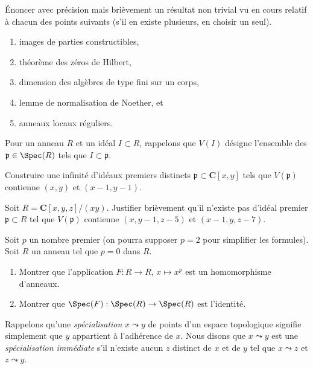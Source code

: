 \begin{exercise}[Théorèmes]
\label{exercise-results-fall-2019}
Énoncer avec précision mais brièvement un résultat non trivial vu en cours
relatif à chacun des points suivants (s'il en existe plusieurs, en choisir
un seul).
\begin{enumerate}
\item images de parties constructibles,
\item théorème des zéros de Hilbert,
\item dimension des algèbres de type fini sur un corps,
\item lemme de normalisation de Noether, et
\item anneaux locaux réguliers.
\end{enumerate}
\end{exercise}

\noindent
Pour un anneau $R$ et un idéal $I \subset R$, rappelons que $V(I)$
désigne l'ensemble des $\mathfrak p \in \Spec(R)$ tels que $I \subset \mathfrak p$.

\begin{exercise}
\label{exercise-infinitely-many-primes}
Construire une infinité d'idéaux premiers distincts
$\mathfrak p \subset \mathbf{C}[x, y]$
tels que $V(\mathfrak p)$ contienne $(x, y)$ et $(x - 1, y - 1)$.
\end{exercise}

\begin{exercise}
\label{exercise-no-prime}
Soit $R = \mathbf{C}[x, y, z]/(xy)$. Justifier brièvement qu'il n'existe pas
d'idéal premier $\mathfrak p \subset R$ tel que
$V(\mathfrak p)$ contienne $(x, y - 1, z - 5)$ et $(x - 1, y, z - 7)$.
\end{exercise}

\begin{exercise}[Frobenius]
\label{exercise-frobenius}
Soit $p$ un nombre premier (on pourra supposer $p = 2$ pour simplifier les formules).
Soit $R$ un anneau tel que $p = 0$ dans $R$.
\begin{enumerate}
\item Montrer que l'application $F : R \to R$, $x \mapsto x^p$ est un homomorphisme d'anneaux.
\item Montrer que $\Spec(F) : \Spec(R) \to \Spec(R)$ est l'identité.
\end{enumerate}
\end{exercise}

\noindent
Rappelons qu'une {\it spécialisation} $x \leadsto y$ de points d'un espace topologique
signifie simplement que $y$ appartient à l'adhérence de $x$. Nous disons que $x \leadsto y$ est une
{\it spécialisation immédiate} s'il n'existe aucun $z$ distinct
de $x$ et de $y$ tel que $x \leadsto z$ et $z \leadsto y$.

